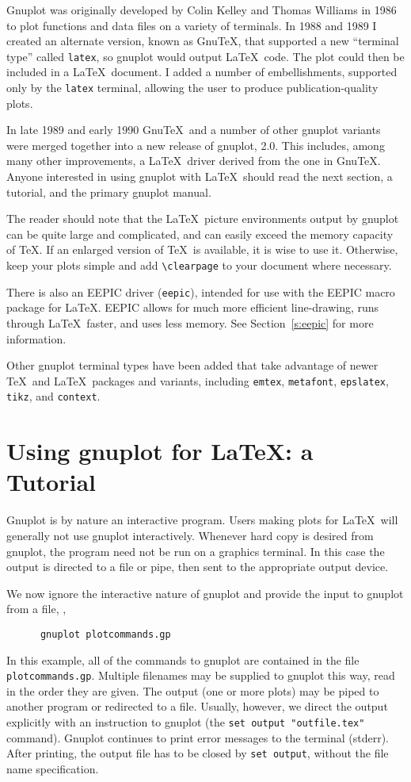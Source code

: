 Gnuplot was originally developed by Colin Kelley and Thomas Williams
in 1986 to plot functions and data files on a variety of terminals.
In 1988 and 1989 I created an alternate version, known as Gnu\TeX,
that supported a new ``terminal type'' called {\tt latex}, so gnuplot
would output \LaTeX\ code. The plot could then be included in a
\LaTeX\ document. I added a number of embellishments, supported only
by the {\tt latex} terminal, allowing the user to produce
publication-quality plots.

In late 1989 and early 1990 Gnu\TeX\ and a number of other gnuplot
variants were merged together into a new release of gnuplot, 2.0. This
includes, among many other improvements, a \LaTeX\ driver derived from
the one in Gnu\TeX.
Anyone interested in using gnuplot with \LaTeX\ should read the next
section, a tutorial, and the primary gnuplot manual.

The reader should note that the \LaTeX\ picture environments output by
gnuplot can be quite large and complicated, and can easily exceed the
memory capacity of \TeX. If an enlarged version of \TeX\ is available,
it is wise to use it. Otherwise, keep your plots simple and add
\verb+\clearpage+ to your document where necessary.

There is also an EEPIC driver ({\tt eepic}), intended for use with
the EEPIC macro package for \LaTeX. EEPIC allows for much more
efficient line-drawing, runs through \LaTeX\ faster, and uses less
memory.  See Section~\ref{s:eepic} for more information.

Other gnuplot terminal types have been added that take advantage of
newer \TeX\ and \LaTeX\ packages and variants, including {\tt emtex}, 
{\tt metafont}, {\tt epslatex}, {\tt tikz}, and {\tt context}.

\section{Using gnuplot for \LaTeX: a Tutorial}

Gnuplot is by nature an interactive program. Users making plots for
\LaTeX\ will generally not use gnuplot interactively.  Whenever hard
copy is desired from gnuplot, the program need not be run on a
graphics terminal. In this case the output is directed to a file or
pipe, then sent to the appropriate output device.

We now ignore the interactive nature of gnuplot and provide the input
to gnuplot from a file, \ie,
\begin{verbatim}
      gnuplot plotcommands.gp
\end{verbatim}
In this example, all of the commands to gnuplot are contained in the
file {\tt plotcommands.gp}. Multiple filenames may be supplied to gnuplot
this way, read in the order they are given.  The output (one or more
plots) may be piped to another program or redirected to a file.
Usually, however, we direct the output explicitly with an instruction
to gnuplot (the {\tt set output "outfile.tex"} command). Gnuplot continues to
print error messages to the terminal (stderr). After printing, the output file
has to be closed by {\tt set output}, \ie{} without the file name specification.

